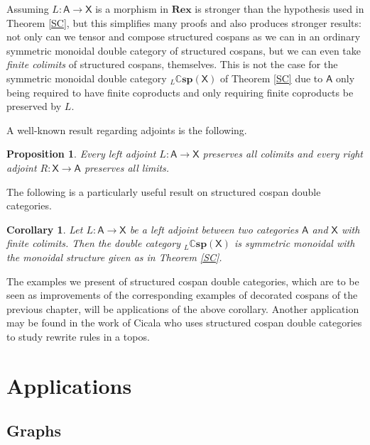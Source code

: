 \documentclass[oneside,final]{ucr}
\newtheorem{proposition}[theorem]{Proposition}
\newtheorem{corollary}[theorem]{Corollary}
\theoremstyle{definition}
\newcommand{\maps}{\colon}
\newcommand{\X}{\mathsf{X}}
\begin{document}
{Assuming $L \colon \mathsf{A} \to \mathsf{X}$ is a morphism in $\mathbf{Rex}$ is stronger than the hypothesis used in Theorem \ref{SC}, but this simplifies many proofs and also produces stronger results: not only can we tensor and compose structured cospans as we can in an ordinary symmetric monoidal double category of structured cospans, but we can even take \emph{finite colimits} of structured cospans, themselves. This is not the case for the symmetric monoidal double category $_L \mathbb{C}\mathbf{sp}(\mathsf{X})$ of Theorem \ref{SC} due to $\mathsf{A}$ only being required to have finite coproducts and only requiring finite coproducts be preserved by $L$.


A well-known result regarding adjoints is the following.
\begin{proposition}
Every left adjoint $L \colon \mathsf{A} \to \mathsf{X}$ preserves all colimits and every right adjoint $R \colon \mathsf{X} \to \mathsf{A}$ preserves all limits.
\end{proposition}

The following is a particularly useful result on structured cospan double categories.

\begin{corollary}\label{AdjointSC}
Let $L \maps \mathsf{A} \to \mathsf{X}$ be a left adjoint between two categories $\mathsf{A}$ and $\X$ with finite colimits. Then the double category $_L \mathbb{C}\mathbf{sp}(\mathsf{X})$ is symmetric monoidal with the monoidal structure given as in Theorem \ref{SC}.
\end{corollary}
The examples we present of structured cospan double categories, which are to be seen as improvements of the corresponding examples of decorated cospans of the previous chapter, will be applications of the above corollary. Another application may be found in the work of Cicala \cite{Cic} who uses structured cospan double categories to study rewrite rules in a topos.


\section{Applications}\label{SecSCApp}

\subsection{Graphs}\label{scgraphs}

}
\end{document}
